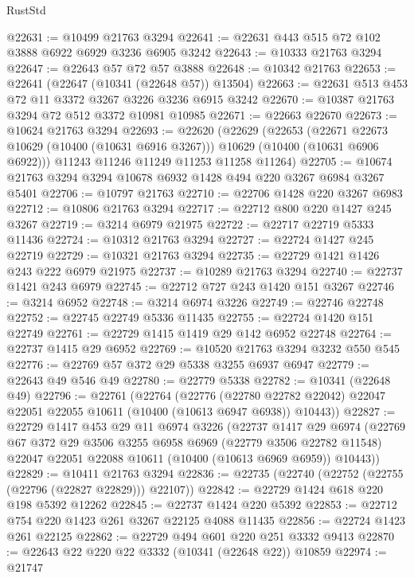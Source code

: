\begin{lexlean}{RustStd}
\begin{coremodule}
{\begin{coremodule}
{{{{{{{{{{{{{{{{{{{{{{{{{@22631 := @10499 @21763 @3294
@22641 := @22631 @443 @515 @72 @102 @3888 @6922 @6929 @3236 @6905 @3242
@22643 := @10333 @21763 @3294
@22647 := @22643 @57 @72 @57 @3888
@22648 := @10342 @21763
@22653 := @22641 (@22647 (@10341 (@22648 @57)) @13504)
@22663 := @22631 @513 @453 @72 @11 @3372 @3267 @3226 @3236 @6915 @3242
@22670 := @10387 @21763 @3294 @72 @512 @3372 @10981 @10985
@22671 := @22663 @22670
@22673 := @10624 @21763 @3294
@22693 := @22620
    (@22629
      (@22653
        (@22671 @22673 @10629 (@10400 (@10631 @6916 @3267)))
        @10629
        (@10400 (@10631 @6906 @6922)))
      @11243
      @11246
      @11249
      @11253
      @11258
      @11264)
@22705 := @10674 @21763 @3294 @3294 @10678 @6932 @1428 @494 @220 @3267 @6984 @3267 @5401
@22706 := @10797 @21763
@22710 := @22706 @1428 @220 @3267 @6983
@22712 := @10806 @21763 @3294
@22717 := @22712 @800 @220 @1427 @245 @3267
@22719 := @3214 @6979 @21975
@22722 := @22717 @22719 @5333 @11436
@22724 := @10312 @21763 @3294
@22727 := @22724 @1427 @245 @22719
@22729 := @10321 @21763 @3294
@22735 := @22729 @1421 @1426 @243 @222 @6979 @21975
@22737 := @10289 @21763 @3294
@22740 := @22737 @1421 @243 @6979
@22745 := @22712 @727 @243 @1420 @151 @3267
@22746 := @3214 @6952
@22748 := @3214 @6974 @3226
@22749 := @22746 @22748
@22752 := @22745 @22749 @5336 @11435
@22755 := @22724 @1420 @151 @22749
@22761 := @22729 @1415 @1419 @29 @142 @6952 @22748
@22764 := @22737 @1415 @29 @6952
@22769 := @10520 @21763 @3294 @3232 @550 @545
@22776 := @22769 @57 @372 @29 @5338 @3255 @6937 @6947
@22779 := @22643 @49 @546 @49
@22780 := @22779 @5338
@22782 := @10341 (@22648 @49)
@22796 := @22761
    (@22764
      (@22776
        (@22780 @22782 @22042)
        @22047
        @22051
        @22055
        @10611
        (@10400 (@10613 @6947 @6938))
        @10443))
@22827 := @22729
    @1417
    @453
    @29
    @11
    @6974
    @3226
    (@22737
      @1417
      @29
      @6974
      (@22769
        @67
        @372
        @29
        @3506
        @3255
        @6958
        @6969
        (@22779 @3506 @22782 @11548)
        @22047
        @22051
        @22088
        @10611
        (@10400 (@10613 @6969 @6959))
        @10443))
@22829 := @10411 @21763 @3294
@22836 := @22735 (@22740 (@22752 (@22755 (@22796 (@22827 @22829))) @22107))
@22842 := @22729 @1424 @618 @220 @198 @5392 @12262
@22845 := @22737 @1424 @220 @5392
@22853 := @22712 @754 @220 @1423 @261 @3267 @22125 @4088 @11435
@22856 := @22724 @1423 @261 @22125
@22862 := @22729 @494 @601 @220 @251 @3332 @9413
@22870 := @22643 @22 @220 @22 @3332 (@10341 (@22648 @22)) @10859
@22974 := @21747
}}}}}}}}}}}}}}}}}}}}}}}}}
\end{coremodule}}
\end{coremodule}
\end{lexlean}
